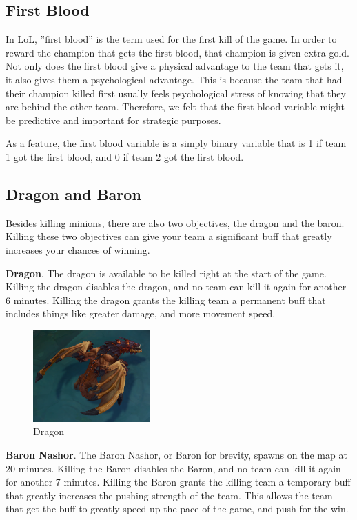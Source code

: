 \documentclass[runningheads]{llncs}
\begin{document}
	\subsection{First Blood}
	
	In LoL, ''first blood'' is the term used for the first kill of the game. In order to reward the champion that gets the first blood, that champion is given extra gold. Not only does the first blood give a physical advantage to the team that gets it, it also gives them a psychological advantage. This is because the team that had their champion killed first usually feels psychological stress of knowing that they are behind the other team. Therefore, we felt that the first blood variable might be predictive and important for strategic purposes.

	As a feature, the first blood variable is a simply binary variable that is 1 if team 1 got the first blood, and 0 if team 2 got the first blood.
	
	\subsection{Dragon and Baron}
	
	Besides killing minions, there are also two objectives, the dragon and the baron. Killing these two objectives can give your team a significant buff that greatly increases your chances of winning.

	\textbf{Dragon}. The dragon is available to be killed right at the start of the game. Killing the dragon disables the dragon, and no team can kill it again for another 6 minutes. Killing the dragon grants the killing team a permanent buff that includes things like greater damage, and more movement speed.

	\begin{figure}
		\centering
		\includegraphics[width=0.4\textwidth]{images/dragon.png}
		\caption{Dragon}
	\end{figure}		

	\textbf{Baron Nashor}. The Baron Nashor, or Baron for brevity, spawns on the map at 20 minutes. Killing the Baron disables the Baron, and no team can kill it again for another 7 minutes. Killing the Baron grants the killing team a temporary buff that greatly increases the pushing strength of the team. This allows the team that get the buff to greatly speed up the pace of the game, and push for the win. 
\end{document}
